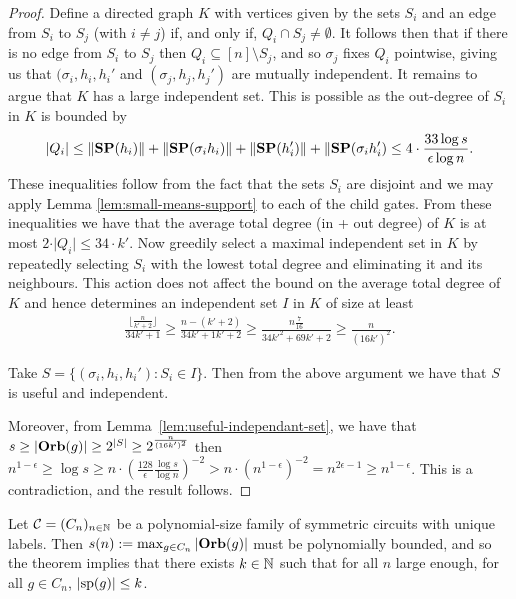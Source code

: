 \documentclass[../paper.tex]{subfiles}
\begin{document}
\begin{proof}
  Define a directed graph $K$ with vertices given by the sets $S_i$ and an edge
  from $S_i$ to $S_j$ (with $i \neq j$) if, and only if, $Q_i \cap S_j \neq
  \emptyset$. It follows then that if there is no edge from $S_i$ to $S_j$ then
  $Q_i \subseteq [n]\setminus S_j$, and so $\sigma_j$ fixes $Q_i$ pointwise,
  giving us that $(\sigma_i, h_i, h_i'$ and $(\sigma_j, h_j, h_j')$ are mutually
  independent. It remains to argue that $K$ has a large independent set. This is
  possible as the out-degree of $S_i$ in $K$ is bounded by
  \begin{align*}
    \vert Q_i \vert \leq \|\text{\textbf{SP}}(h_i) \| + \|\text{\textbf{SP}}(\sigma_i h_i) \| + \|\text{\textbf{SP}}(h_i') \| + \|\text{\textbf{SP}}(\sigma_i h_i') \leq 4 \cdot \frac{33\log s}{\epsilon \log n}.
  \end{align*}
  These inequalities follow from the fact that the sets $S_i$ are disjoint and
  we may apply Lemma \ref{lem:small-means-support} to each of the child gates.
  From these inequalities we have that the average total degree (in + out
  degree) of $K$ is at most $2 \cdot \vert Q_i \vert \leq 34 \cdot k'$. Now
  greedily select a maximal independent set in $K$ by repeatedly selecting $S_i$
  with the lowest total degree and eliminating it and its neighbours. This
  action does not affect the bound on the average total degree of $K$ and hence
  determines an independent set $I$ in $K$ of size at least
  \begin{align*}
    \frac{\lfloor \frac{n}{k' + 2} \rfloor}{34k' + 1} \geq \frac{n - (k'+2)}{34k'+1k'+2} \geq \frac{n\frac{7}{16}}{34k'^2 + 69k' +2} \geq \frac{n}{(16k')^2}.
  \end{align*}

  Take $S = \{(\sigma_i, h_i, h_i') : S_i \in I \}$. Then from the above
  argument we have that $S$ is useful and independent.
  
  Moreover, from Lemma~\ref{lem:useful-independant-set}, we have that $s \geq
  \vert \text{\textbf{Orb}}(g) \vert \geq 2^{\vert S \vert} \geq 2^{\frac{n}{(16k')^2}}$ then
  $n^{1-\epsilon} \geq \log s \geq n \cdot (\frac{128}{\epsilon}\frac{\log
    s}{\log n})^{-2} > n \cdot (n^{1-\epsilon})^{-2} = n^{2\epsilon -1} \geq
  n^{1-\epsilon}$. This is a contradiction, and the result follows.
\end{proof}
 
Let $\mathcal{C} = (C_n)_{n \in \mathbb{N}}$ be a polynomial-size family of symmetric
circuits with unique labels. Then $s(n) := \max_{g \in C_n} \vert \text{\textbf{Orb}} (g)\vert$
must be polynomially bounded, and so the theorem implies that there exists $k
\in \mathbb{N}$ such that for all $n$ large enough, for all $g \in C_n$, $\vert
\text{sp}(g) \vert \leq k$.
\end{document}
